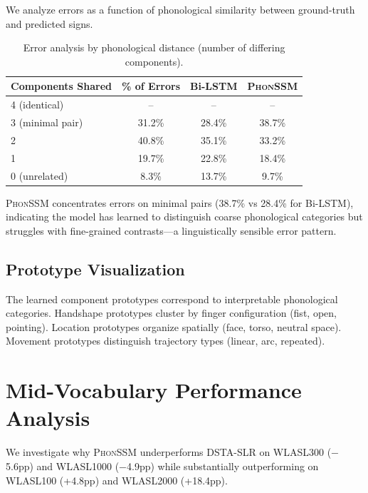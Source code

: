 \documentclass{article}
\newcommand{\phonssm}{\textsc{PhonSSM}}
\begin{document}
We analyze errors as a function of phonological similarity between ground-truth and predicted signs.

\begin{table}[ht]
\caption{Error analysis by phonological distance (number of differing components).}
\label{tab:error_distance}
\vspace{-1mm}
\begin{center}
\begin{small}
\begin{tabular*}{\columnwidth}{@{\extracolsep{\fill}}lccc@{}}
\toprule
Components Shared & \% of Errors & Bi-LSTM & \phonssm{} \\
\midrule
4 (identical) & -- & -- & -- \\
3 (minimal pair) & 31.2\% & 28.4\% & 38.7\% \\
2 & 40.8\% & 35.1\% & 33.2\% \\
1 & 19.7\% & 22.8\% & 18.4\% \\
0 (unrelated) & 8.3\% & 13.7\% & 9.7\% \\
\bottomrule
\end{tabular*}
\end{small}
\end{center}
\vspace{-2mm}
\end{table}

\phonssm{} concentrates errors on minimal pairs (38.7\% vs 28.4\% for Bi-LSTM), indicating the model has learned to distinguish coarse phonological categories but struggles with fine-grained contrasts---a linguistically sensible error pattern.

\subsection{Prototype Visualization}

The learned component prototypes correspond to interpretable phonological categories. Handshape prototypes cluster by finger configuration (fist, open, pointing). Location prototypes organize spatially (face, torso, neutral space). Movement prototypes distinguish trajectory types (linear, arc, repeated).

\section{Mid-Vocabulary Performance Analysis}
\label{app:midvocab}

We investigate why \phonssm{} underperforms DSTA-SLR on WLASL300 ($-$5.6pp) and WLASL1000 ($-$4.9pp) while substantially outperforming on WLASL100 (+4.8pp) and WLASL2000 (+18.4pp).
\end{document}
